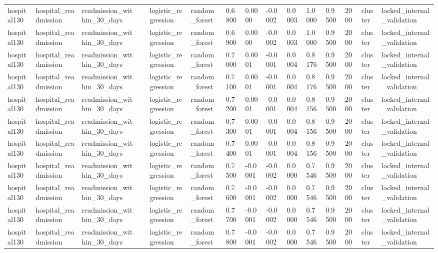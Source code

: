 \begin{tabular}{lllllllllllllll}
hospital130 & hospital\_readmission & readmission\_within\_30\_days &  & logistic\_regression & random\_forest & 0.6800 & 0.0000 & -0.0002 & 0.0003 & 1.0000 & 0.9500 & 2000 & cluster & locked\_internal\_validation \\
hospital130 & hospital\_readmission & readmission\_within\_30\_days &  & logistic\_regression & random\_forest & 0.6900 & 0.0000 & -0.0002 & 0.0003 & 1.0000 & 0.9500 & 2000 & cluster & locked\_internal\_validation \\
hospital130 & hospital\_readmission & readmission\_within\_30\_days &  & logistic\_regression & random\_forest & 0.7000 & 0.0001 & -0.0001 & 0.0004 & 0.8176 & 0.9500 & 2000 & cluster & locked\_internal\_validation \\
hospital130 & hospital\_readmission & readmission\_within\_30\_days &  & logistic\_regression & random\_forest & 0.7100 & 0.0001 & -0.0001 & 0.0004 & 0.8176 & 0.9500 & 2000 & cluster & locked\_internal\_validation \\
hospital130 & hospital\_readmission & readmission\_within\_30\_days &  & logistic\_regression & random\_forest & 0.7200 & 0.0001 & -0.0001 & 0.0004 & 0.8156 & 0.9500 & 2000 & cluster & locked\_internal\_validation \\
hospital130 & hospital\_readmission & readmission\_within\_30\_days &  & logistic\_regression & random\_forest & 0.7300 & 0.0001 & -0.0001 & 0.0004 & 0.8156 & 0.9500 & 2000 & cluster & locked\_internal\_validation \\
hospital130 & hospital\_readmission & readmission\_within\_30\_days &  & logistic\_regression & random\_forest & 0.7400 & 0.0001 & -0.0001 & 0.0004 & 0.8156 & 0.9500 & 2000 & cluster & locked\_internal\_validation \\
hospital130 & hospital\_readmission & readmission\_within\_30\_days &  & logistic\_regression & random\_forest & 0.7500 & -0.0001 & -0.0002 & 0.0000 & 0.7546 & 0.9500 & 2000 & cluster & locked\_internal\_validation \\
hospital130 & hospital\_readmission & readmission\_within\_30\_days &  & logistic\_regression & random\_forest & 0.7600 & -0.0001 & -0.0002 & 0.0000 & 0.7546 & 0.9500 & 2000 & cluster & locked\_internal\_validation \\
hospital130 & hospital\_readmission & readmission\_within\_30\_days &  & logistic\_regression & random\_forest & 0.7700 & -0.0001 & -0.0002 & 0.0000 & 0.7546 & 0.9500 & 2000 & cluster & locked\_internal\_validation \\
hospital130 & hospital\_readmission & readmission\_within\_30\_days &  & logistic\_regression & random\_forest & 0.7800 & -0.0001 & -0.0002 & 0.0000 & 0.7546 & 0.9500 & 2000 & cluster & locked\_internal\_validation \\

\end{tabular}

